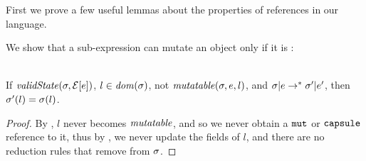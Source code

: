 
	First we prove a few useful lemmas about the properties of references in our language.

	\LS

	\noindent We show that a sub-expression can mutate an object only if it is \muty:
	\SS\begin{Lemma}\ \\
		\indent If $\mathit{validState}(\sigma,\mathcal{E}[e])$, $l \in \mathit{dom}(\sigma)$, not $\mathit{mutatable}(\sigma, e, l)$, and $\sigma|e \rightarrow^* \sigma'|e'$, then $\sigma'(l) = \sigma(l)$.
	\end{Lemma}
	\SS\begin{proof}
	By , $l$ never becomes $\mathit{mutatable}$, and so we never obtain a $\texttt{mut}$ or $\texttt{capsule}$ reference to it, thus by , we never update the fields of $l$, and there are no reduction rules that remove from $\sigma$.
	\end{proof}


